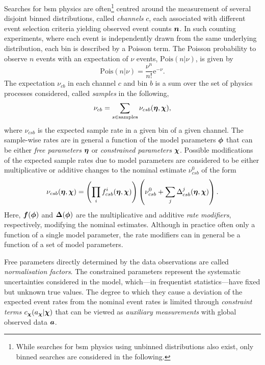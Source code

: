 Searches for \gls{bsm} physics are often\footnote{While searches for \gls{bsm} physics using unbinned distributions also exist, only binned searches are considered in the following.} centred around the measurement of several disjoint binned distributions, called \textit{channels} $c$, each associated with different event selection criteria yielding observed event counts $\makemebold{n}$.
In such counting experiments, where each event is independently drawn from the same underlying distribution, each bin is described by a Poisson term.
The Poisson probability to observe $n$ events with an expectation of $\nu$ events, $\mathrm{Pois}(n\vert\nu)$, is given by
\begin{equation}
	\mathrm{Pois}(n\vert\nu) = \frac{\nu^n}{n!}\mathrm{e}^{-\nu}.
\end{equation}
The expectation $\nu_{cb}$ in each channel $c$ and bin $b$ is a sum over the set of physics processes considered, called \textit{samples} in the following, 
\begin{equation}
	\nu_{cb} = \sum_{s\in\mathrm{samples}}\nu_{csb}(\makemebold{\eta},\makemebold{\chi}),
\end{equation}
where $\nu_{csb}$ is the expected sample rate in a given bin of a given channel. The sample-wise rates are in general a function of the model parameters $\makemebold{\phi}$ that can be either \textit{free parameters} $\makemebold{\eta}$ or \textit{constrained parameters} $\makemebold{\chi}$. Possible modifications of the expected sample rates due to model parameters are considered to be either multiplicative or additive changes to the nominal estimate $\nu_{csb}^0$ of the form
\begin{equation}
	\nu_{csb}(\makemebold{\eta},\makemebold{\chi}) = \left(\prod_i f^i_{csb}(\makemebold{\eta},\makemebold{\chi}) \right)\left(\nu^0_{csb} + \sum_j {\Delta^j_{csb}(\makemebold{\eta},\makemebold{\chi})} \right).
\end{equation}
Here, $\makemebold{f}(\makemebold{\phi})$ and $\makemebold{\Delta}(\makemebold{\phi})$ are the multiplicative and additive \textit{rate modifiers}, respectively, modifying the nominal estimates. Although in practice often only a function of a single model parameter, the rate modifiers can in general be a function of a set of model parameters.

Free parameters directly determined by the data observations are called \textit{normalisation factors}.
The constrained parameters represent the systematic uncertainties considered in the model, which---in frequentist statistics---have fixed but unknown true values.
The degree to which they cause a deviation of the expected event rates from the nominal event rates is limited through \textit{constraint terms} $c_{\makemebold{\chi}}(a_{\makemebold{\chi}}\vert\makemebold{\chi})$ that can be viewed as \textit{auxiliary measurements} with global observed data $\makemebold{a}$. 

